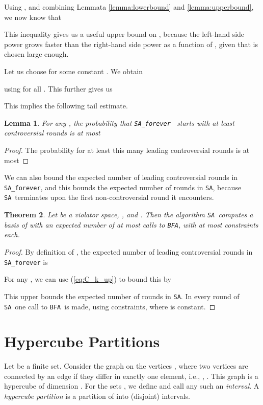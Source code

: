 \documentclass[12pt]{article}
\newtheorem{theorem2}{Theorem}[section]
\newenvironment{theorem}{\begin{theorem2}}{\end{theorem2}}
\newtheorem{lemma2}[theorem2]{Lemma}
\newenvironment{lemma}{\begin{lemma2}}{\end{lemma2}}
\theoremstyle{remark}
\def\stageII{\texttt{SA}}
\def\stageIIforever{\texttt{SA\_forever}}
\def\stageIII{\texttt{BFA}}
\begin{document}
Using , and combining Lemmata \ref{lemma:lowerbound} and  \ref{lemma:upperbound}, 
we now know that


This inequality gives us a useful upper bound on , 
because the left-hand side power grows faster than the right-hand side 
power as a function of , given that  is chosen large enough. 

Let us choose
 for some constant .
We obtain

using   for all . This further gives us


This implies the following tail estimate.
\begin{lemma}
  For any , the probability that \stageIIforever~
  starts with at least  controversial 
  rounds is at most
   
\end{lemma}

\begin{proof}
  The probability for at least this many leading controversial rounds 
  is at most

\end{proof}

We can also bound the expected number of
leading controversial rounds in \stageIIforever, and this
bounds the expected number of rounds in \stageII, because \stageII~terminates upon 
the first non-controversial round it encounters.

\begin{theorem}
\label{theorem:runningtime2}
Let  be a violator space, , and .
Then the algorithm \stageII~computes a basis of  with
 an expected number of at most  calls to \stageIII, with 
at most 
constraints each.
\end{theorem}
\begin{proof}
By definition  of , the expected number of leading controversial rounds
in \stageIIforever{ }is 

For any , we can use (\ref{eq:C_k_up}) to bound this by



This upper bounds the expected number of rounds in \stageII. In every round of \stageII~one call to
\stageIII~is made, using  constraints, where 
is constant.
\end{proof}

\section{Hypercube Partitions}
Let  be a finite set. Consider the graph on the vertices , where two vertices 
are connected by an edge if they differ in exactly one element, i.e., , .
This graph is a hypercube of dimension . For
the sets , we define 
  and call any such
  an \emph{interval}. A \emph{hypercube  partition} is a partition 
 of  into (disjoint) intervals.
 
\end{document}
